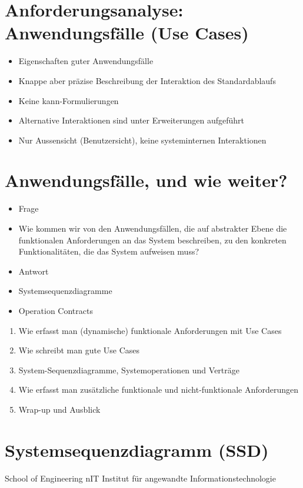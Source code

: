 \documentclass[10pt]{article}
\begin{document}
\section*{Anforderungsanalyse: Anwendungsfälle (Use Cases)}
\begin{itemize}
  \item Eigenschaften guter Anwendungsfälle
  \item Knappe aber präzise Beschreibung der Interaktion des Standardablaufs
  \item Keine kann-Formulierungen
  \item Alternative Interaktionen sind unter Erweiterungen aufgeführt
  \item Nur Aussensicht (Benutzersicht), keine systeminternen Interaktionen
\end{itemize}

\section*{Anwendungsfälle, und wie weiter?}
\begin{itemize}
  \item Frage
  \item Wie kommen wir von den Anwendungsfällen, die auf abstrakter Ebene die funktionalen Anforderungen an das System beschreiben, zu den konkreten Funktionalitäten, die das System aufweisen muss?
  \item Antwort
  \item Systemsequenzdiagramme
  \item Operation Contracts
\end{itemize}

\begin{enumerate}
  \item Wie erfasst man (dynamische) funktionale Anforderungen mit Use Cases
  \item Wie schreibt man gute Use Cases
  \item System-Sequenzdiagramme, Systemoperationen und Verträge
  \item Wie erfasst man zusätzliche funktionale und nicht-funktionale Anforderungen
  \item Wrap-up und Ausblick
\end{enumerate}

\section*{Systemsequenzdiagramm (SSD)}
School of Engineering nIT Institut für angewandte Informationstechnologie
\end{document}
